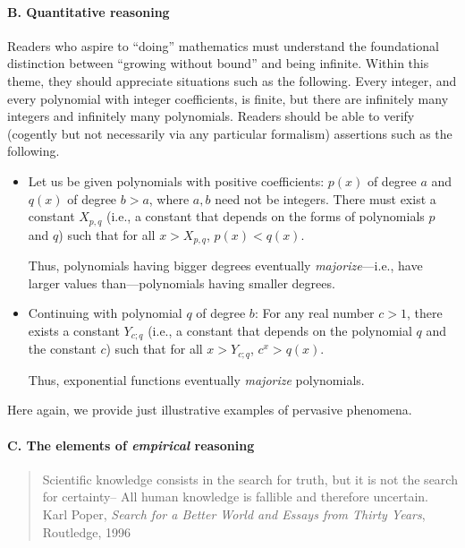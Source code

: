 \paragraph{B. Quantitative reasoning}

Readers who aspire to ``doing'' mathematics must understand the foundational distinction between ``growing without bound'' and being infinite.  Within this theme, they should appreciate situations such as the following.  Every integer, and every polynomial with integer coefficients, is finite, but there are infinitely many integers and infinitely many polynomials.  Readers should be able to verify (cogently but not necessarily via any particular formalism) assertions such as the following.
\begin{itemize}
\item
Let us be given polynomials with positive coefficients: $p(x)$ of degree $a$ and $q(x)$ of degree $b > a$, where $a, b$ need not be integers.  There must exist a constant $X_{p,q}$ (i.e., a constant that depends on the forms of polynomials $p$ and $q$) such that for all $x > X_{p,q}$, $p(x) < q(x)$.


\smallskip

Thus, polynomials having bigger degrees eventually {\em majorize}---i.e., have larger values than---polynomials having smaller degrees.

\item
Continuing with polynomial $q$ of degree $b$: For any real number $c > 1$, there exists a constant $Y_{c;q}$ (i.e., a constant that depends on the polynomial $q$ and the constant $c$) such that for all $x > Y_{c;q}$, $c^x > q(x)$.

\smallskip

Thus, exponential functions eventually {\em majorize} polynomials.
\end{itemize}
Here again, we provide just illustrative examples of pervasive phenomena.

\paragraph{C. The elements of {\em empirical} reasoning}

\begin{quote}
Scientific knowledge consists in the search for truth, but it is not the search for certainty-- All human knowledge is fallible and therefore uncertain. \\
\hspace*{.2in}Karl Poper, {\it Search for a Better World and Essays from Thirty Years}, Routledge, 1996
\end{quote}

